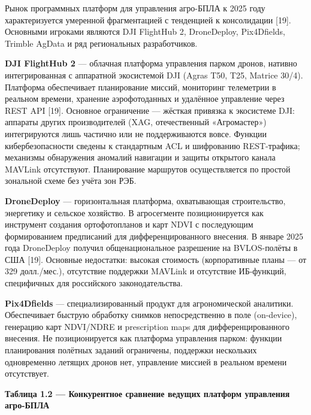 Рынок программных платформ для управления агро-БПЛА к 2025 году характеризуется умеренной фрагментацией с тенденцией к консолидации {[}19{]}. Основными игроками являются DJI FlightHub 2, DroneDeploy, Pix4Dfields, Trimble AgData и ряд региональных разработчиков.

\textbf{DJI FlightHub 2} --- облачная платформа управления парком дронов, нативно интегрированная с аппаратной экосистемой DJI (Agras T50, T25, Matrice 30/4). Платформа обеспечивает планирование миссий, мониторинг телеметрии в реальном времени, хранение аэрофотоданных и удалённое управление через REST API {[}19{]}. Основное ограничение --- жёсткая привязка к экосистеме DJI: аппараты других производителей (XAG, отечественный «Агромастер») интегрируются лишь частично или не поддерживаются вовсе. Функции кибербезопасности сведены к стандартным ACL и шифрованию REST-трафика; механизмы обнаружения аномалий навигации и защиты открытого канала MAVLink отсутствуют. Планирование маршрутов осуществляется по простой зональной схеме без учёта зон РЭБ.

\textbf{DroneDeploy} --- горизонтальная платформа, охватывающая строительство, энергетику и сельское хозяйство. В агросегменте позиционируется как инструмент создания ортофотопланов и карт NDVI с последующим формированием предписаний для дифференцированного внесения. В январе 2025 года DroneDeploy получил общенациональное разрешение на BVLOS-полёты в США {[}19{]}. Основные недостатки: высокая стоимость (корпоративные планы --- от 329 долл./мес.), отсутствие поддержки MAVLink и отсутствие ИБ-функций, специфичных для российского законодательства.

\textbf{Pix4Dfields} --- специализированный продукт для агрономической аналитики. Обеспечивает быструю обработку снимков непосредственно в поле (on-device), генерацию карт NDVI/NDRE и prescription maps для дифференцированного внесения. Не позиционируется как платформа управления парком: функции планирования полётных заданий ограничены, поддержки нескольких одновременно летящих дронов нет, управление миссией в реальном времени отсутствует.

\textbf{Таблица 1.2 --- Конкурентное сравнение ведущих платформ управления агро-БПЛА}

